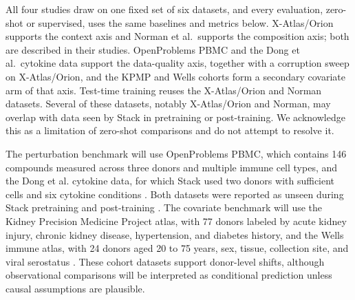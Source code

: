 \documentclass[times, twoside, watermark]{zHenriquesLab-StyleBioRxiv}
\begin{document}
All four studies draw on one fixed set of six datasets, and every evaluation, zero-shot or supervised, uses the same baselines and metrics below. X-Atlas/Orion supports the context axis and Norman et al.\ supports the composition axis; both are described in their studies. OpenProblems PBMC and the Dong et al.\ cytokine data support the data-quality axis, together with a corruption sweep on X-Atlas/Orion, and the KPMP and Wells cohorts form a secondary covariate arm of that axis. Test-time training reuses the X-Atlas/Orion and Norman datasets. Several of these datasets, notably X-Atlas/Orion and Norman, may overlap with data seen by Stack in pretraining or post-training. We acknowledge this as a limitation of zero-shot comparisons and do not attempt to resolve it.

The perturbation benchmark will use OpenProblems PBMC, which contains 146 compounds measured across three donors and multiple immune cell types, and the Dong et al. cytokine data, for which Stack used two donors with sufficient cells and six cytokine conditions \cite{luecken2025openproblems,dong2023cinema}. Both datasets were reported as unseen during Stack pretraining and post-training \cite{dong2026stack}. The covariate benchmark will use the Kidney Precision Medicine Project atlas, with 77 donors labeled by acute kidney injury, chronic kidney disease, hypertension, and diabetes history, and the Wells immune atlas, with 24 donors aged 20 to 75 years, sex, tissue, collection site, and viral serostatus \cite{deboer2021kpmp,wells2025immune}. These cohort datasets support donor-level shifts, although observational comparisons will be interpreted as conditional prediction unless causal assumptions are plausible.
\end{document}
